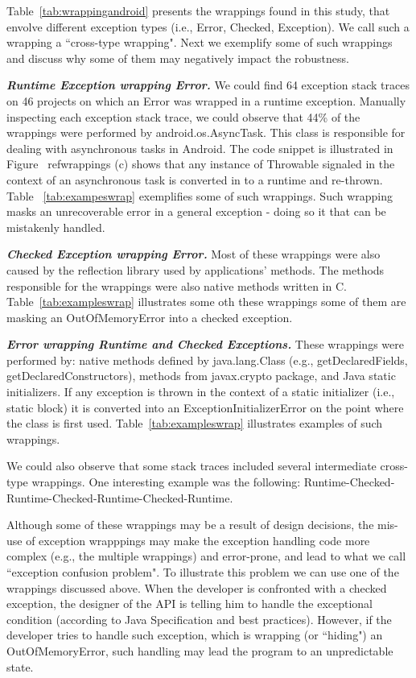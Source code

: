 \documentclass[conference]{IEEEtran}
\begin{document}
Table~\ref{tab:wrappingandroid} presents the wrappings found in this study, that
envolve different exception types (i.e., Error, Checked, Exception). We call 
such a wrapping a ``cross-type wrapping". Next we exemplify some of such
 wrappings and discuss why some of them may negatively impact the robustness.

\emph{\textbf{Runtime Exception wrapping Error.}} We could find  64 exception stack traces 
on 46 projects on which an Error was wrapped in a runtime exception.
Manually inspecting each exception stack trace, we could observe that 44\% of the wrappings were performed 
by android.os.AsyncTask. This class is responsible for dealing with asynchronous tasks in Android.
The code snippet is illustrated in Figure ~ref{wrappings} (c) shows that any instance of Throwable signaled 
in the context of an asynchronous task is converted in to a runtime and re-thrown.  Table ~\ref{tab:exampeswrap} exemplifies some of such wrappings.
Such wrapping masks an unrecoverable error in a general exception - doing so it that can be mistakenly handled.

\emph{\textbf{Checked Exception wrapping Error.}} Most of these wrappings
 were also caused by the reflection library used by applications' methods. The methods responsible for the wrappings
were also native methods written in C. Table~\ref{tab:exampleswrap} illustrates
some oth these wrappings some of them are masking an OutOfMemoryError
into a checked exception.

\emph{\textbf{Error wrapping Runtime and Checked Exceptions.}} 
These wrappings were performed by: native methods defined by 
java.lang.Class (e.g., getDeclaredFields, getDeclaredConstructors), 
methods from javax.crypto package, and Java static initializers. 
If any exception is thrown in the context of a static initializer 
(i.e., static block)  it is converted into an ExceptionInitializerError 
on the point where the class is first used.  Table~\ref{tab:exampleswrap} illustrates
examples of such wrappings.

We could also observe that some stack traces included several intermediate cross-type wrappings.
One interesting example was the following: Runtime-Checked-Runtime-Checked-Runtime-Checked-Runtime.

Although some of these wrappings may be a result of design decisions,
the mis-use of exception wrapppings may make the exception handling 
code more complex (e.g., the multiple wrappings) and error-prone,
 and lead to what we call ``exception confusion problem". To illustrate this problem we can use one of the wrappings discussed above.
When the developer is confronted with a checked exception, the designer of the API is telling him 
to handle the exceptional condition (according to Java Specification and 
best practices). However, if the developer tries to handle such exception,
which is wrapping (or ``hiding") an OutOfMemoryError, such handling 
may lead the program to an unpredictable state.
\end{document}
